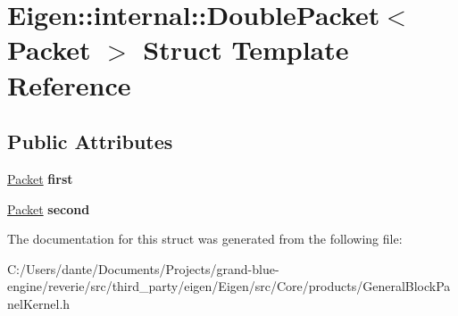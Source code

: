 \hypertarget{struct_eigen_1_1internal_1_1_double_packet}{}\section{Eigen\+::internal\+::Double\+Packet$<$ Packet $>$ Struct Template Reference}
\label{struct_eigen_1_1internal_1_1_double_packet}
\subsection*{Public Attributes}
\begin{DoxyCompactItemize}
\item 
\mbox{\label{struct_eigen_1_1internal_1_1_double_packet_adc3064d8af45a76916e6467c31f1fdaa}} 
\mbox{\hyperlink{union_eigen_1_1internal_1_1_packet}{Packet}} {\bfseries first}
\item 
\mbox{\label{struct_eigen_1_1internal_1_1_double_packet_a65a886a57baa7bcc561d53ae58455245}} 
\mbox{\hyperlink{union_eigen_1_1internal_1_1_packet}{Packet}} {\bfseries second}
\end{DoxyCompactItemize}


The documentation for this struct was generated from the following file\+:\begin{DoxyCompactItemize}
\item 
C\+:/\+Users/dante/\+Documents/\+Projects/grand-\/blue-\/engine/reverie/src/third\+\_\+party/eigen/\+Eigen/src/\+Core/products/General\+Block\+Panel\+Kernel.\+h\end{DoxyCompactItemize}
